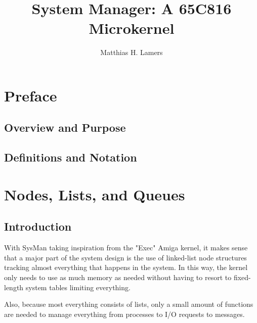 \documentclass{memoir}
\title{System Manager: A 65C816 Microkernel}
\author{Matthias H. Lamers}
\begin{document}
	\frontmatter
	\maketitle
	
	\tableofcontents
	
	\chapter{Preface}
	\section{Overview and Purpose}
	
	\section{Definitions and Notation}
	
	\mainmatter
	\chapter{Nodes, Lists, and Queues}
	\section{Introduction}
	With SysMan taking inspiration from the "Exec" Amiga kernel, it makes sense that a major part of the system design is the use of linked-list node structures tracking almost everything that happens in the system. In this way, the kernel only needs to use as much memory as needed without having to resort to fixed-length system tables limiting everything.
	
	Also, because most everything consists of lists, only a small amount of functions are needed to manage everything from processes to I/O requests to messages.
\end{document}
